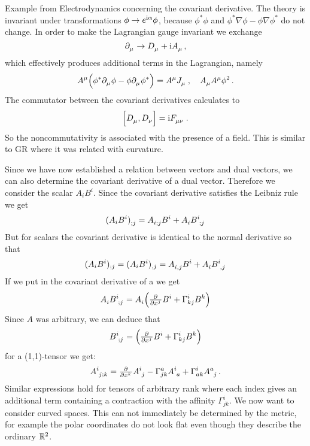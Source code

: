 \begin{remark} Example from Electrodynamics concerning the covariant derivative. 
The theory is invariant under transformations $\phi\to e^{\mathrm{i} \alpha}\phi$, 
because $\phi^*\phi$ and $\phi^*\nabla\phi-\phi\nabla\phi^*$ do not change.
In order to make the Lagrangian gauge invariant we exchange
\begin{equation}
\tensor{\partial}{_\mu}\to\tensor{D}{_\mu}+\imI\tensor{A}{_\mu}\, ,
\end{equation}
which effectively produces additional terms in the Lagrangian, namely
\begin{equation}
\tensor{A}{^\mu}\left(\phi^*\tensor{\partial}{_\mu}\phi
-\phi\tensor{\partial}{_\mu}\phi^*\right)=\tensor{A}{^\mu}\tensor{J}{_\mu}\,,
\quad\tensor{A}{_\mu}\tensor{A}{^\mu}\phi^2\,.
\end{equation}
The commutator between the covariant derivatives calculates to  
\begin{equation}
\left[\tensor{D}{_\mu},\tensor{D}{_\nu}\right]=\imI \tensor{F}{_\mu_\nu}\,.
\end{equation}
So the noncommutativity is associated with the presence of a field. This is
similar to GR where it was related with curvature. 
\end{remark}
Since we have now established a relation between vectors and dual vectors, we
can also determine the covariant derivative of a dual vector. Therefore we
consider the scalar $A_iB^i$. Since the covariant derivative satisfies the
Leibniz rule we get
\begin{align}
\tensor{(A_iB^i)}{_{;j}} =
\tensor{A}{_i_;_j}\tensor{B}{^i}+\tensor{A}{_i}\tensor{B}{^i_;_j}
\end{align}
But for scalars the covariant derivative is identical to the normal derivative
so that 
\begin{align}
(A_iB^i)_{;j} =(A_iB^i)_{,j}=
\tensor{A}{_i_,_j}\tensor{B}{^i}+\tensor{A}{_i}\tensor{B}{^i_,_j}
\end{align}
If we put in the covariant derivative of a we get 
\begin{equation}
\tensor{A}{_i}\tensor{B}{^i_;_j}=\tensor{A}{_i}\left(\pd{}{{x^j}}B^i+\Gamma^i_{kj}\tensor{B}{^k}\right)
\end{equation}
Since $A$ was arbitrary, we can deduce that
\begin{equation}
\tensor{B}{^i_;_j}=\left(\pd{}{{x^j}}B^i+\Gamma^i_{kj}\tensor{B}{^k}\right)
\end{equation}
for a (1,1)-tensor we get:
\begin{equation}
\tensor{A}{^i_j_;_k}=\pd{}{{x^k}}\tensor{A}{^i_j}-\Gamma^a_{jk}\tensor{A}{^i_a}+\Gamma^i_{ak}\tensor{A}{^a_j}\,
.\end{equation}
Similar expressions hold for tensors of arbitrary rank where each index gives an
additional term containing a contraction with the affinity $\Gamma^i_{jk}$. 
We now want to consider curved spaces. This can not immediately be determined by
the metric, for example the polar coordinates do not look flat even though they
describe the ordinary $\mathbb{R}^2$.

